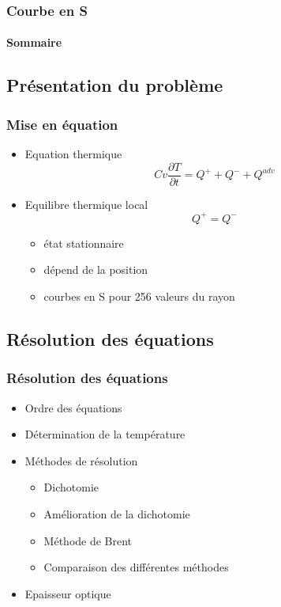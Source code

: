 \documentclass[french]{beamer}
\begin{document}
\begin{frame}
\frametitle{Courbe en S}
\framesubtitle{Sommaire}
\tableofcontents[currentsection]
\end{frame}



\begin{frame}
\section{Présentation du problème}
\frametitle{Mise en équation}


\begin{itemize}

\item Equation thermique
\begin{equation}
Cv\frac{\partial T}{\partial t} = Q^+ + Q^- +Q^{adv}
\end{equation}

\item Equilibre thermique local
\begin{equation}
Q^+ = Q^- 
\end{equation}

\begin{itemize}
\item état stationnaire
\\
\item dépend de la position
\item courbes en S pour 256 valeurs du rayon
\end{itemize}
\end{itemize}
\end{frame}


\begin{frame}
\section{Résolution des équations}

\frametitle{Résolution des équations}
\begin{itemize}
\item Ordre des équations
\item Détermination de la température
\item Méthodes de résolution
\begin{itemize}
\item Dichotomie
\item Amélioration de la dichotomie
\item Méthode de Brent
\item Comparaison des différentes méthodes
\end{itemize}
\item Epaisseur optique
\end{itemize}
\end{frame}
\end{document}
